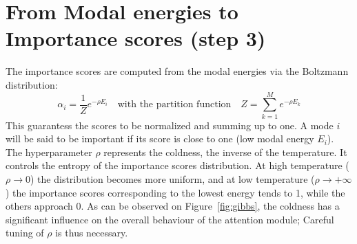 
\section{From Modal energies to Importance scores (step 3)}\label{sec:step3}
The importance scores are computed from the modal energies via the Boltzmann distribution:
\begin{equation}
\alpha_i = \frac{1}{Z}e^{-\rho E_i} \quad \text{with the partition function} \quad Z = \sum_{k=1}^M e^{-\rho E_k} 
\label{eq:gibbs-distrib}
\end{equation}
This guarantess the scores to be normalized and summing up to one. A mode $i$ will be said to be important if its score is close to one (low modal energy $E_i$). The hyperparameter $\rho$ represents the coldness, the inverse of the temperature. It controls the entropy of the importance scores distribution. At high temperature ($\rho \rightarrow 0$) the distribution becomes more uniform, and at low temperature ($\rho \rightarrow +\infty$) the importance scores corresponding to the lowest energy tends to 1, while the others approach 0. As can be observed on Figure \,\ref{fig:gibbs}, the coldness has a significant influence on the overall behaviour of the attention module; Careful tuning of $\rho$ is thus necessary.

